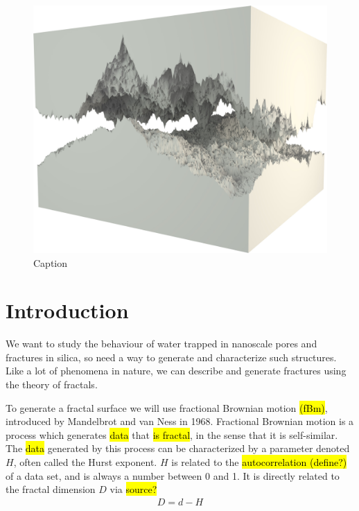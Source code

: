 \begin{figure}[htpb]%
    \centering%
    \includegraphics[width=\textwidth]{images/fracture/large_fracture05.jpg}%
    \caption{Caption}%
\end{figure}%

\chapter{Introduction}
We want to study the behaviour of water trapped in nanoscale pores and fractures in silica, so need a way to generate and characterize such structures. Like a lot of phenomena in nature, we can describe and generate fractures using the theory of fractals\cite{mandelbrot1983fractal}. 



To generate a fractal surface we will use fractional Brownian motion \hl{(fBm)}, introduced by Mandelbrot and van Ness in 1968\cite{mandelbrot1968fractional}. Fractional Brownian motion is a process which generates \hl{data} that \hl{is fractal}, in the sense that it is self-similar. The \hl{data} generated by this process can be characterized by a parameter denoted $H$, often called the Hurst exponent. $H$ is related to the \hl{autocorrelation (define?)} of a data set, and is always a number between 0 and 1. It is directly related to the fractal dimension $D$ via \hl{source?}
\begin{align*}
    D = d - H
\end{align*}

